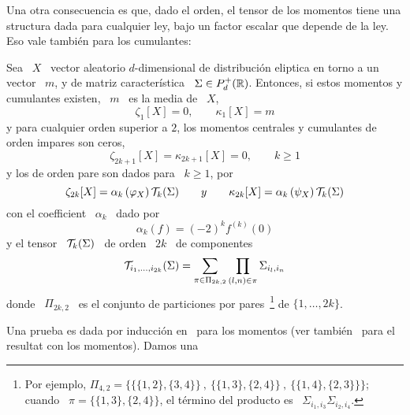 Una otra consecuencia es que, dado el orden, el tensor de los momentos tiene una
structura dada para cualquier ley, bajo un factor escalar que depende de la ley.
Eso vale tambi\'en para los cumulantes:
%
\begin{teorema}\label{Teo:MP:MomentosCumulantesEliptica}
%
  Sea \  $X$ \  vector aleatorio $d$-dimensional  de distribuci\'on  eliptica en
  torno a  un  vector \  $m$,  y  de  matriz  caracter\'istica \  $\Sigma  \in
  P_d^+(\mathbb{R})$.  Entonces, si  estos momentos y cumulantes existen,  \ $m$ \ es
  la media de \ $X$, \ie
  \[
  \zeta_1[X] = 0, \qquad \kappa_1[X] = m
  \]
  y para cualquier orden superior a  $2$, los momentos centrales y cumulantes de
  orden impares son ceros,
  \[
  \zeta_{2 k + 1}[X] = \kappa_{2 k + 1}[X] = 0, \qquad k \ge 1
  \]
  y los de orden pare son dados para \ $k \ge 1$, por
  \[
  \zeta_{2 k}[X] = \alpha_k\left(  \varphi_X   \right) \mathcal{T}_k(\Sigma)
 \qquad  y \qquad \kappa_{2 k}[X] = \alpha_k\left(  \psi_X   \right) \mathcal{T}_k(\Sigma)
  \]
  con el coefficient \ $\alpha_k$ \ dado por
  \[
  \alpha_k(f) = (-2)^k f^{(k)}(0)
  \]
  y el tensor \ $\mathcal{T}_k(\Sigma)$ \ de orden \ $2 k$ \ de componentes
  \[
  \mathcal{T}_{i_1,\ldots,i_{2k}}(\Sigma) = \sum_{\pi \in \Pi_{2 k , 2}} \prod_{(l,n) \in
    \pi} \Sigma_{i_l,i_n}
  \]
  donde   \  $\Pi_{2   k  ,   2}$   \  es   el  conjunto   de  particiones   por
  pares~\footnote{Por  ejemplo, $\Pi_{4,2}  =  \Big\{ \big\{  \{1,2\} ,  \{3,4\}
    \big\} \:  , \: \big\{  \{1,3\} ,  \{2,4\} \big\} \:  , \: \big\{  \{1,4\} ,
    \{2,3\} \big\} \big\}$; cuando \ $\pi = \big\{ \{1,3\} , \{2,4\} \Big\}$, el
    t\'ermino del producto es \ $\Sigma_{i_1,i_3} \Sigma_{i_2,i_4}$.} de $\{ 1 ,
  \ldots , 2 k \}$.
\end{teorema}
%
Una prueba  es dada  por inducci\'on en~\cite{BerBen86}  para los  momentos (ver
tambi\'en~\cite[p.~44]{FanKot90} para el resultat  con los momentos).  Damos una
